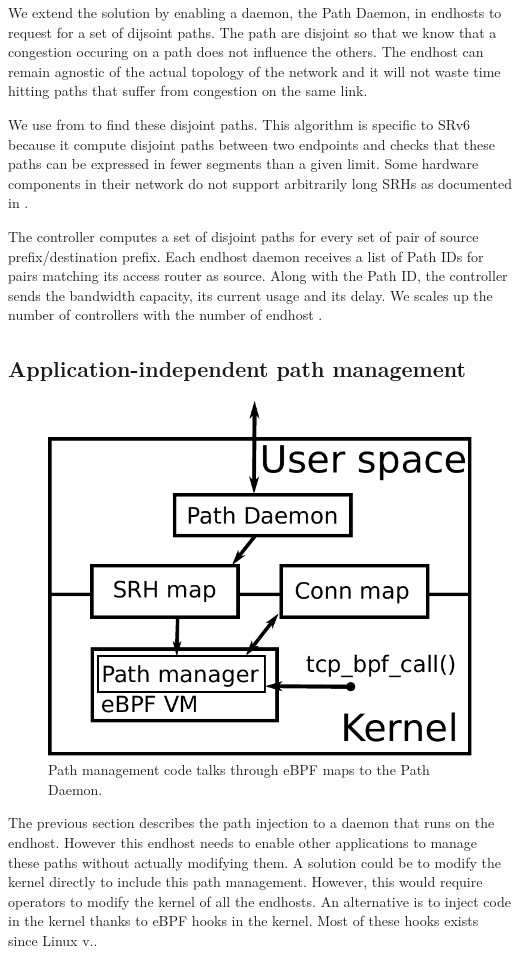 We extend the solution by enabling a daemon, the Path Daemon,
in endhosts to request for a set of dijsoint paths.
The path are disjoint so that we know that a congestion occuring on a path does not influence
the others. The endhost can remain agnostic of the actual topology of the network and it
will not waste time hitting paths that suffer from congestion on the same link.

We use  from \cite{aubry2015traffic} to find these disjoint paths.
This algorithm is specific
to SRv6 because it compute disjoint paths between two endpoints and checks that these paths can be expressed
in fewer segments than a given limit. Some hardware components in their network
do not support arbitrarily long SRHs as documented in \cite{sr-hardware-segment-limit}.

The controller computes a set of disjoint paths for every set of pair of source prefix/destination prefix.
Each endhost daemon receives a list of Path IDs for pairs matching its access router as source.
Along with the Path ID, the controller sends the bandwidth capacity, its current usage and its delay.
We scales up the number of controllers with the number of endhost
.

\subsection{Application-independent path management}

\begin{figure}
	\centering
	\includegraphics[width=0.5\columnwidth]{figs/ebpf_representation.pdf}
	\caption{Path management code talks through eBPF maps to the Path Daemon.}
	\label{fig:ebpf-representation}
\end{figure}

The previous section describes the path injection to a daemon that runs on the endhost.
However this endhost needs to enable other applications to manage these paths without actually modifying them.
A solution could be to modify the kernel directly to include this path management.
However, this would require operators to modify the kernel of all the endhosts.
An alternative is to inject code in the kernel thanks to eBPF hooks in the kernel.
Most of these hooks exists since Linux v..

